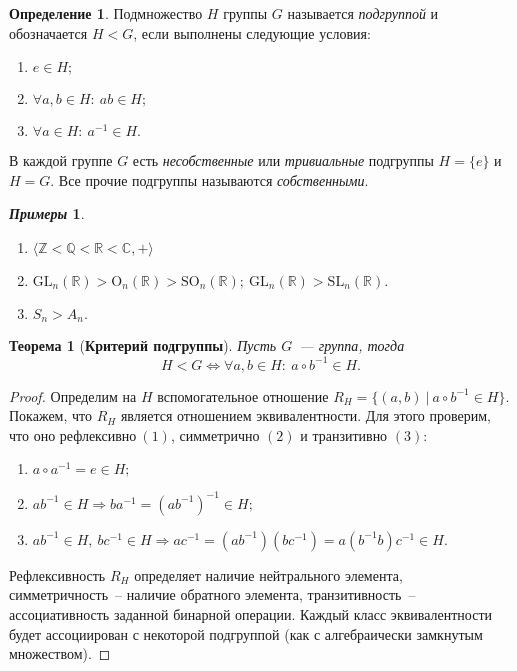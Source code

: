 \documentclass[a4paper, 14pt]{extarticle}
\newcommand{\n}{\par}
\newcommand{\integers}{\mathbb{Z}}
\newcommand{\rationals}{\mathbb{Q}}
\newcommand{\real}{\mathbb{R}}
\newcommand{\complex}{\mathbb{C}}
\newcommand{\GL}{\mathrm{GL}}
\newcommand{\SL}{\mathrm{SL}}
\newcommand{\Orth}{\mathrm{O}}
\newcommand{\SOrth}{\mathrm{SO}}
\theoremstyle{definition}
\newtheorem*{exmpls}{\textit{Примеры}}
\newtheorem{definition}{Определение}
\theoremstyle{plain}
\newtheorem*{theorem*}{Теорема}
\numberwithin{theorem}{section}
\numberwithin{definition}{section}
\numberwithin{statement}{section}
\numberwithin{lemma}{section}
\numberwithin{consequence}{section}
\begin{document}
		\begin{definition}	
			Подмножество $H$ группы $G$ называется \textit{подгруппой} и обозначается $H < G$, если выполнены следующие условия:
			\begin{enumerate}
				\setlength\itemsep{0.1em}
				\item $e \in H;$
				\item $\forall a,b \in H{:} \ ab \in H;$
				\item $\forall a \in H{:} \ a^{-1} \in H.$
			\end{enumerate}
		\end{definition}
		В каждой группе $G$ есть \textit{несобственные} или \textit{тривиальные} подгруппы $H = \{e\}$ и $H = G$. Все прочие подгруппы называются \textit{собственными}.
		\begin{exmpls}
			\
			\begin{enumerate}
				\setlength\itemsep{0.1em}
				\item ${\langle \integers < \rationals < \real < \complex, + \rangle}$
				\item ${\GL_n(\real) > \Orth_n(\real) > \SOrth_n(\real); \ \GL_n(\real) > \SL_n(\real).}$
				\item ${S_n > A_n.}$
			\end{enumerate}
		\end{exmpls}
		\begin{theorem*}[\textbf{Критерий подгруппы}]
			Пусть $G$~--- группа, тогда
			\begin{equation*}
				H < G \Longleftrightarrow \forall a,b \in H{:} \ a \circ b^{-1} \in H.
			\end{equation*}
		\end{theorem*}
		\begin{proof}
			Определим на $H$ вспомогательное отношение ${R_H = \{(a,b)\ | \ a \circ b^{-1} \in H\}}.$ Покажем, что $R_H$ является отношением эквивалентности. Для этого проверим, что оно ${\text{рефлексивно} \ (1)}$, симметрично $(2)$ и транзитивно $(3)$:
			\begin{enumerate}
				\setlength\itemsep{0.1em}
				\item $a \circ a^{-1} = e \in H;$
				\item $ab^{-1} \in H \Longrightarrow b a^{-1} = (ab^{-1})^{-1} \in H;$
				\item $ab^{-1} \in H, \ bc^{-1} \in H \Longrightarrow ac^{-1} = (ab^{-1})(bc^{-1}) = a(b^{-1}b)c^{-1} \in H.$
			\end{enumerate} \n
			
			Рефлексивность $R_H$ определяет наличие нейтрального элемента, симметричность~-- наличие обратного элемента, транзитивность~-- ассоциативность заданной бинарной операции. Каждый класс эквивалентности будет ассоциирован с некоторой подгруппой (как с алгебраически замкнутым множеством). 
		\end{proof}
\end{document}

